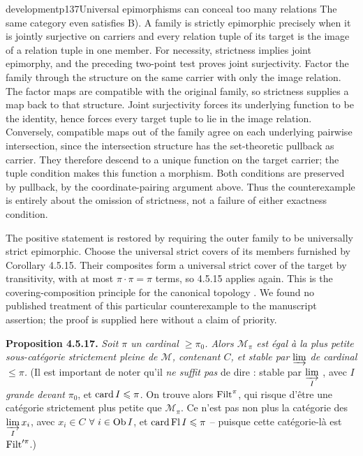 \begin{dcomment}{development}{p137}{Universal epimorphisms can conceal too many relations}
The same category even satisfies B). A family is strictly epimorphic precisely when it is jointly surjective on carriers and every relation tuple of its target is the image of a relation tuple in one member. For necessity, strictness implies joint epimorphy, and the preceding two-point test proves joint surjectivity. Factor the family through the structure on the same carrier with only the image relation. The factor maps are compatible with the original family, so strictness supplies a map back to that structure. Joint surjectivity forces its underlying function to be the identity, hence forces every target tuple to lie in the image relation. Conversely, compatible maps out of the family agree on each underlying pairwise intersection, since the intersection structure has the set-theoretic pullback as carrier. They therefore descend to a unique function on the target carrier; the tuple condition makes this function a morphism. Both conditions are preserved by pullback, by the coordinate-pairing argument above. Thus the counterexample is entirely about the omission of strictness, not a failure of either exactness condition.

The positive statement is restored by requiring the outer family to be universally strict epimorphic. Choose the universal strict covers of its members furnished by Corollary 4.5.15. Their composites form a universal strict cover of the target by transitivity, with at most $\pi\cdot\pi=\pi$ terms, so 4.5.15 applies again. This is the covering-composition principle for the canonical topology \citep[Expos\'e II, 2.5--2.6]{SGA4I1972}. We found no published treatment of this particular counterexample to the manuscript assertion; the proof is supplied here without a claim of priority.
\end{dcomment}


\textbf{Proposition 4.5.17.} \textit{Soit $\pi$ un cardinal $\geqslant \pi_0$. Alors $\mathcal{M}_{\pi}$ est égal à la plus petite sous-catégorie strictement pleine de $\mathcal{M}$, contenant $C$, et stable par} $\varinjlim$ \textit{de cardinal $\leqslant \pi$.} (Il est important de noter qu'il \textit{ne suffit pas} de dire : stable par $\varinjlim\limits_{I}$ , avec \textit{$I$ grande devant} $\pi_0$, et $\operatorname{card} I \leqslant \pi$. On trouve alors $\operatorname{Filt}^{\pi}$, qui risque d'être une catégorie strictement plus petite que $\mathcal{M}_{\pi}$. Ce n'est pas non plus la catégorie des $\varinjlim\limits_{I} x_i$, avec $x_i \in C$ $\forall\ i \in \mathrm{Ob}\, I$, et $\operatorname{card} \operatorname{Fl} I \leqslant \pi$ -- puisque cette catégorie-là est $\operatorname{Filt}'^{\pi}$.)


